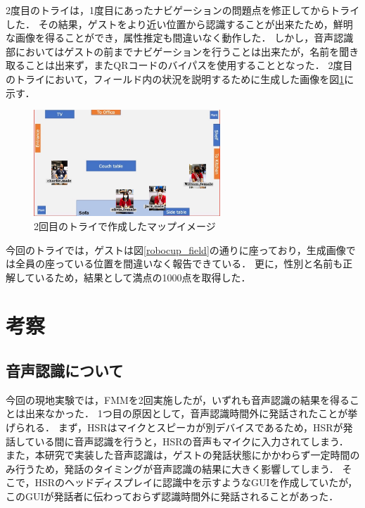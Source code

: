 \documentclass[a4j]{jarticle}
\begin{document}
2度目のトライは，1度目にあったナビゲーションの問題点を修正してからトライした．
その結果，ゲストをより近い位置から認識することが出来たため，鮮明な画像を得ることができ，属性推定も間違いなく動作した．
しかし，音声認識部においてはゲストの前までナビゲーションを行うことは出来たが，名前を聞き取ることは出来ず，またQRコードのバイパスを使用することとなった．
2度目のトライにおいて，フィールド内の状況を説明するために生成した画像を図\ref{result_FMM_2}に示す．
\begin{figure}[t]
  \centering
  \includegraphics[width=7cm]{images/FMM/mapimage.png}
  \caption{2回目のトライで作成したマップイメージ}
  \label{result_FMM_2}
\end{figure}
今回のトライでは，ゲストは図\ref{robocup_field}の通りに座っており，生成画像では全員の座っている位置を間違いなく報告できている．
更に，性別と名前も正解しているため，結果として満点の1000点を取得した．


\section{考察}

\subsection{音声認識について}
今回の現地実験では，FMMを2回実施したが，いずれも音声認識の結果を得ることは出来なかった．
1つ目の原因として，音声認識時間外に発話されたことが挙げられる．
まず，HSRはマイクとスピーカが別デバイスであるため，HSRが発話している間に音声認識を行うと，HSRの音声もマイクに入力されてしまう．
また，本研究で実装した音声認識は，ゲストの発話状態にかかわらず一定時間のみ行うため，発話のタイミングが音声認識の結果に大きく影響してしまう．
そこで，HSRのヘッドディスプレイに認識中を示すようなGUIを作成していたが，このGUIが発話者に伝わっておらず認識時間外に発話されることがあった．
\end{document}
